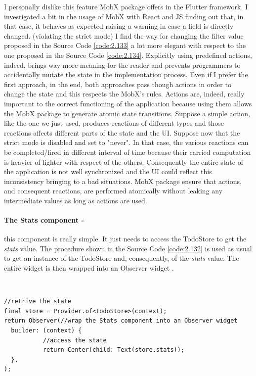 I personally dislike this feature MobX package offers in the Flutter framework. I investigated a bit in the usage of MobX with React and JS finding out that, in that case, it behaves as expected raising a warning in case a field is directly changed. (violating the strict mode) I find the way for changing the filter value proposed in the Source Code \ref{code:2.133} a lot more elegant with respect to the one proposed in the Source Code \ref{code:2.134}. Explicitly using predefined actions, indeed, brings way more meaning for the reader and prevents programmers to accidentally mutate the state in the implementation process. Even if I prefer the first approach, in the end,  both approaches pass though actions in order to change the state and this respects the MobX's rules. Actions are, indeed, really important to the correct functioning of the application because using them allows the MobX package to generate atomic state transitions. Suppose a simple action, like the one we just used,  produces reactions of different types and those reactions affects different parts of the state and the UI. Suppose now that the strict mode is disabled and set to "never". In that case, the various reactions can be completed/fired in different interval of time because their carried computation is heavier of lighter with respect of the others. Consequently the entire state of the application is not well synchronized and the UI could reflect this inconsistency bringing to a bad situations. MobX package ensure that actions, and consequent reactions, are performed atomically without leaking any intermediate values as long as actions are used.
\paragraph{The Stats component - }
\label{subpar:todo_app_bloc_core_state} this component is really simple. It just needs to access the TodoStore to get the \textit{stats} value. The procedure shown in the Source Code \ref{code:2.132} is used as usual to get an instance of the TodoStore and, consequently, of the \textit{stats} value. The entire widget is then wrapped into an Observer widget .
\begin{code}
\mbox{}\\
 \mbox{}
		\label{code:2.14}
\begin{verbatim}
//retrive the state
final store = Provider.of<TodoStore>(context);
return Observer(//wrap the Stats component into an Observer widget
  builder: (context) {
           //access the state
           return Center(child: Text(store.stats));
  },
);
\end{verbatim}
\mbox{}
\end{code}
